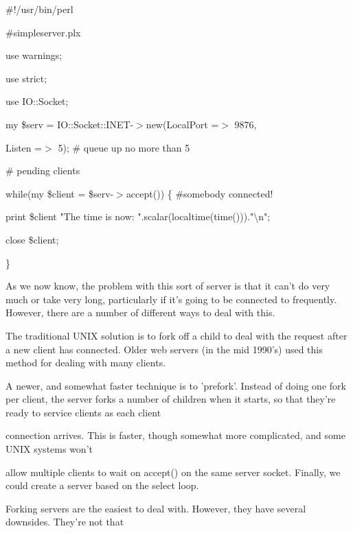 \documentclass[a4paper,11pt]{book}
\begin{document}
\noindent 

\noindent 

\noindent \#!/usr/bin/perl

\noindent \#simpleserver.plx

\noindent use warnings;

\noindent use strict;

\noindent use IO::Socket;

\noindent 

\noindent my \$serv = IO::Socket::INET-$>$new(LocalPort =$>$ 9876,

\noindent Listen =$>$ 5); \# queue up no more than 5

\noindent \# pending clients

\noindent 

\noindent while(my \$client = \$serv-$>$accept()) \{ \#somebody connected!

\noindent print \$client "The time is now: ".scalar(localtime(time()))."\textbackslash n";

\noindent close \$client;

\noindent \}

\noindent 

\noindent As we now know, the problem with this sort of server is that it can't do very much or take very long, particularly if it's going to be connected to frequently. However, there are a number of different ways to deal with this.

\noindent 

\noindent The traditional UNIX solution is to fork off a child to deal with the request after a new client has connected. Older web servers (in the mid 1990's) used this method for dealing with many clients.

\noindent 

\noindent A newer, and somewhat faster technique is to 'prefork'. Instead of doing one fork per client, the server forks a number of children when it starts, so that they're ready to service clients as each client

\noindent connection arrives. This is faster, though somewhat more complicated, and some UNIX systems won't

\noindent allow multiple clients to wait on accept() on the same server socket. Finally, we could create a server based on the select loop.

\noindent Forking servers are the easiest to deal with. However, they have several downsides. They're not that
\end{document}
